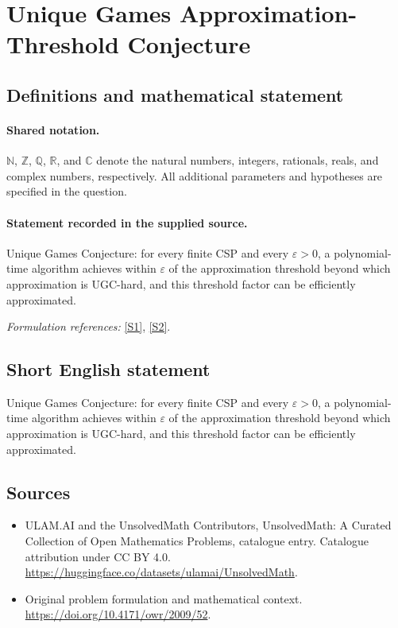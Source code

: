 \documentclass[11pt]{article}
\newcommand{\sref}[2]{\hyperlink{source:#1:#2}{[S#2]}}
\begin{document}
\section{Unique Games Approximation-Threshold Conjecture}\label{statement}

\subsection{Definitions and mathematical statement}

\paragraph{Shared notation.}$\mathbb N$, $\mathbb Z$, $\mathbb Q$, $\mathbb R$, and $\mathbb C$ denote the natural numbers, integers, rationals, reals, and complex numbers, respectively. All additional parameters and hypotheses are specified in the question.


\paragraph{Statement recorded in the supplied source.}
Unique Games Conjecture: for every finite CSP and every $\varepsilon>0$, a polynomial-time algorithm achieves within $\varepsilon$ of the approximation threshold beyond which approximation is UGC-hard, and this threshold factor can be efficiently approximated.
\par\smallskip\textit{Formulation references:} \sref{statement}{1}, \sref{statement}{2}.
\subsection{Short English statement}
Unique Games Conjecture: for every finite CSP and every $\varepsilon>0$, a polynomial-time algorithm achieves within $\varepsilon$ of the approximation threshold beyond which approximation is UGC-hard, and this threshold factor can be efficiently approximated.
\subsection{Sources}
\begin{itemize}
\item[\hypertarget{source:statement:1}{S1}] ULAM.AI and the UnsolvedMath Contributors, UnsolvedMath: A Curated Collection of Open Mathematics Problems, catalogue entry. Catalogue attribution under CC BY 4.0.
\url{https://huggingface.co/datasets/ulamai/UnsolvedMath}.
\item[\hypertarget{source:statement:2}{S2}] Original problem formulation and mathematical context.
\url{https://doi.org/10.4171/owr/2009/52}.
\end{itemize}
\label{end:statement}
\end{document}
